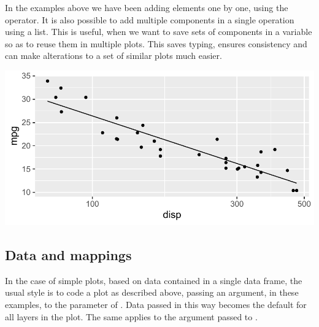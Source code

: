 \documentclass[krantz2]{krantz}\usepackage{knitr}
\begin{document}
\begin{infobox}
  In the examples above we have been adding elements one by one, using the \code{+} operator. It is also possible to add multiple components in a single operation using a list. This is useful, when we want to save sets of components in a variable so as to reuse them in multiple plots. This saves typing, ensures consistency and can make alterations to a set of similar plots much easier.

\begin{knitrout}\footnotesize
{}\color{fgcolor}\begin{kframe}
\begin{alltt}
 \hlkwb{<-} \hlstd{(}
  \hlstd{(} \hlstd{=} \hlstd{,}  \hlstd{=} \hlstd{),}
  \hlstd{())}
\end{alltt}
\end{kframe}
\end{knitrout}

\begin{knitrout}\footnotesize
{}\color{fgcolor}\begin{kframe}
\begin{alltt}
 \hlopt{+} 
\end{alltt}
\end{kframe}

{\centering \includegraphics[width=.7\textwidth]{figure/pos-ggplot-objects-info-02-1} 

}



\end{knitrout}

\end{infobox}

\subsection{Data and mappings}
In the case of simple plots, based on data contained in a single data frame, the usual style is to code a plot as described above, passing an argument,  in these examples, to the  parameter of . Data passed in this way becomes the default for all layers in the plot. The same applies to the argument passed to .
\end{document}
